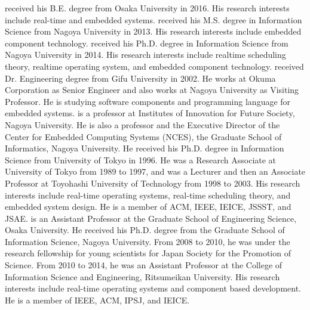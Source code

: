 \begin{biography}
{
received his B.E. degree from Osaka University in 2016.
His research interests include real-time and embedded systems\@.
}
{
received his M.S. degree in Information Science from Nagoya University in 2013.
His research interests include embedded component technology\@.
}
{
received his Ph.D. degree in Information Science from Nagoya University in 2014.
His research interests include realtime scheduling theory, realtime operating system, and embedded component technology\@.
}
{
received Dr. Engineering degree from Gifu University in 2002.
He works at Okuma Corporation as Senior Engineer and also works at Nagoya University as Visiting Professor.
He is studying software components and programming language for embedded systems\@.
}
{
is a professor at Institutes of Innovation for Future Society, Nagoya University.
He is also a professor and the Executive Director of the Center for Embedded Computing Systems (NCES), the Graduate School of Informatics, Nagoya University.
He received his Ph.D. degree in Information Science from University of Tokyo in 1996.
He was a Research Associate at University of Tokyo from 1989 to 1997, and was a Lecturer and then an Associate Professor at Toyohashi University of Technology from 1998 to 2003.
His research interests include real-time operating systems, real-time scheduling theory, and embedded system design.
He is a member of ACM, IEEE, IEICE, JSSST, and JSAE\@.
}
{
is an Assistant Professor at the Graduate School of Engineering Science, Osaka University. 
He received his Ph.D. degree from the Graduate School of Information Science, Nagoya University.
From 2008 to 2010, he was under the research fellowship for young scientists for Japan Society for the Promotion of Science.
From 2010 to 2014, he was an Assistant Professor at the College of Information Science and Engineering, Ritsumeikan University.
His research interests include real-time operating systems and component based development.
He is a member of IEEE, ACM, IPSJ, and IEICE\@.
}


\end{biography}
